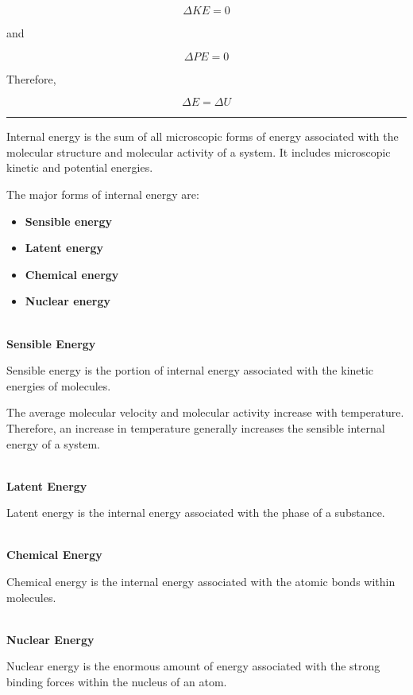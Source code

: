 \documentclass[12pt]{article}
\newcommand{\mysubsection}[2]{%
    \vspace{5px}
    \noindent{\headingfont\large #1\space #2\par}
    \vspace{4pt}
    \hrule
    \vspace{15pt}
}
\begin{document}
\begin{equation*}
\Delta KE = 0
\end{equation*}

and

\begin{equation*}
\Delta PE = 0
\end{equation*}

Therefore,

\begin{equation*}
\Delta E = \Delta U
\end{equation*}

\mysubsection{}{Internal Energy}

Internal energy is the sum of all microscopic forms of energy associated with the molecular structure and molecular activity of a system. It includes microscopic kinetic and potential energies.

The major forms of internal energy are:

\begin{itemize}
    \item \textbf{Sensible energy}
    \item \textbf{Latent energy}
    \item \textbf{Chemical energy}
    \item \textbf{Nuclear energy}
\end{itemize}

\textbf{\\ Sensible Energy}

Sensible energy is the portion of internal energy associated with the kinetic energies of molecules.



The average molecular velocity and molecular activity increase with temperature. Therefore, an increase in temperature generally increases the sensible internal energy of a system.

\textbf{\\ Latent Energy}

Latent energy is the internal energy associated with the phase of a substance.


\textbf{\\ Chemical Energy}

Chemical energy is the internal energy associated with the atomic bonds within molecules.


\textbf{\\ Nuclear Energy}

Nuclear energy is the enormous amount of energy associated with the strong binding forces within the nucleus of an atom.
\end{document}

